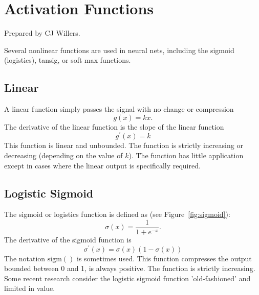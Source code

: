
\chapter{Activation Functions}
\label{sec:ActivationFunctions}

Prepared by CJ Willers.



Several nonlinear functions are used in neural nets, including the sigmoid (logistics), tansig, or soft max
functions\cite{Pedamonti2018,Nwankpa2018,stackexchangeEllefsen2015,WikiPediaHyperbolicfunction2019,NickBecker2017,DustinStansbury2014,HamzaMahmood2018}. 

\section{Linear}

A linear function simply passes the signal with no change or compression
\begin{equation}
g(x)=kx.
\end{equation}  
The derivative of the linear function is the slope of the linear function
\begin{equation}
g^\prime(x) = k
\end{equation}
This function is linear and unbounded. The function is strictly increasing or decreasing (depending on the value of $k$). The function has little application except in cases where the linear output is specifically required.


\section{Logistic Sigmoid}

The sigmoid or logistics function is defined as (see Figure~\ref{fig:sigmoid}):
\begin{equation}
\sigma(x)
=\frac{1}{1+e^{-x}}.
\end{equation}  
The derivative of the sigmoid function is 
\begin{equation}
 \sigma^\prime(x)
 =\sigma(x)(1-\sigma(x))
\end{equation}
The notation $\textrm{sigm}()$ is sometimes used.
This function compresses the output bounded between 0 and 1, is always positive. The function is strictly increasing. Some recent research consider the logistic sigmoid function 'old-fashioned' and limited in value.

